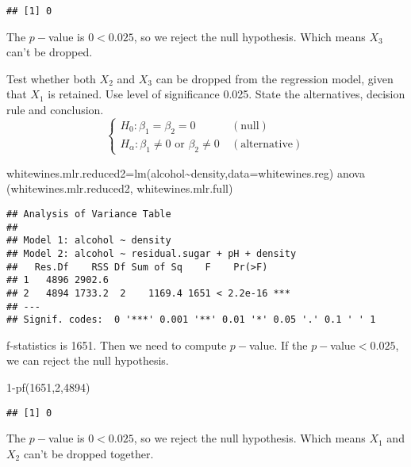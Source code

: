 \documentclass[
]{article}
\newenvironment{Shaded}{\begin{snugshade}}{\end{snugshade}}
\newcommand{\AttributeTok}[1]{\textcolor[rgb]{0.77,0.63,0.00}{#1}}
\newcommand{\DecValTok}[1]{\textcolor[rgb]{0.00,0.00,0.81}{#1}}
\newcommand{\FunctionTok}[1]{\textcolor[rgb]{0.00,0.00,0.00}{#1}}
\newcommand{\NormalTok}[1]{#1}
\newcommand{\OtherTok}[1]{\textcolor[rgb]{0.56,0.35,0.01}{#1}}
\newcommand{\SpecialCharTok}[1]{\textcolor[rgb]{0.00,0.00,0.00}{#1}}
\begin{document}
\begin{verbatim}
## [1] 0
\end{verbatim}

The \(p-\)value is \(0<0.025\), so we reject the null hypothesis. Which
means \(X_3\) can't be dropped.

Test whether both \(X_2\) and \(X_3\) can be dropped from the regression
model, given that \(X_1\) is retained. Use level of significance 0.025.
State the alternatives, decision rule and conclusion. \[
\left\{\begin{array}{l}
H_{0}: \beta_1=\beta_2=0\ &(\text{null})\\
H_{\alpha}:\beta_1\neq0\text{ or }\beta_2\neq0\ &(\text{alternative})
\end{array}\right.
\]

\begin{Shaded}
\begin{Highlighting}[]
\NormalTok{whitewines.mlr.reduced2}\OtherTok{=}\FunctionTok{lm}\NormalTok{(alcohol}\SpecialCharTok{\textasciitilde{}}\NormalTok{density,}\AttributeTok{data=}\NormalTok{whitewines.reg)}
\FunctionTok{anova}\NormalTok{ (whitewines.mlr.reduced2, whitewines.mlr.full)}
\end{Highlighting}
\end{Shaded}

\begin{verbatim}
## Analysis of Variance Table
## 
## Model 1: alcohol ~ density
## Model 2: alcohol ~ residual.sugar + pH + density
##   Res.Df    RSS Df Sum of Sq    F    Pr(>F)    
## 1   4896 2902.6                                
## 2   4894 1733.2  2    1169.4 1651 < 2.2e-16 ***
## ---
## Signif. codes:  0 '***' 0.001 '**' 0.01 '*' 0.05 '.' 0.1 ' ' 1
\end{verbatim}

f-statistics is 1651. Then we need to compute \(p-\)value. If the
\(p-\)value\(<0.025\), we can reject the null hypothesis.

\begin{Shaded}
\begin{Highlighting}[]
\DecValTok{1}\SpecialCharTok{{-}}\FunctionTok{pf}\NormalTok{(}\DecValTok{1651}\NormalTok{,}\DecValTok{2}\NormalTok{,}\DecValTok{4894}\NormalTok{)}
\end{Highlighting}
\end{Shaded}

\begin{verbatim}
## [1] 0
\end{verbatim}

The \(p-\)value is \(0<0.025\), so we reject the null hypothesis. Which
means \(X_1\) and \(X_2\) can't be dropped together.
\end{document}

